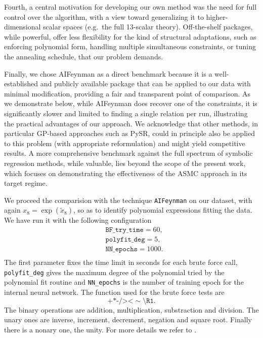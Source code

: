 \documentclass[11pt,a4paper]{article}
\begin{document}
Fourth, a central motivation for developing our own method was the need for full control over the algorithm, with a view toward generalizing it to higher-dimensional scalar spaces (e.g.\ the full 13-scalar theory). Off-the-shelf packages, while powerful, offer less flexibility for the kind of structural adaptations, such as enforcing polynomial form, handling multiple simultaneous constraints, or tuning the annealing schedule, that our problem demands.

Finally, we chose AIFeynman as a direct benchmark because it is a well-established and publicly available package that can be applied to our data with minimal modification, providing a fair and transparent point of comparison. As we demonstrate below, while AIFeynman does recover one of the constraints, it is significantly slower and limited to finding a single relation per run, illustrating the practical advantages of our approach. We acknowledge that other methods, in particular GP-based approaches such as PySR, could in principle also be applied to this problem (with appropriate reformulation) and might yield competitive results. A more comprehensive benchmark against the full spectrum of symbolic regression methods, while valuable, lies beyond the scope of the present work, which focuses on demonstrating the effectiveness of the ASMC approach in its target regime.

We proceed the comparision with the technique \texttt{AIFeynman} \cite{Udrescu:2019mnk} on our dataset, with again $x_8 = \exp(\tilde{x}_8)$, so as to identify polynomial expressions fitting the data. We have run it with the following configuration 
\begin{equation}
	\begin{aligned}
		&\texttt{BF\_try\_time} = 60, \\
		&\texttt{polyfit\_deg} = 5, \\
		&\texttt{NN\_epochs} = 1000.\\
	\end{aligned}
\end{equation}
The first parameter fixes the time limit in seconds for each brute force call, \texttt{polyfit\_deg} gives the maximum degree of the polynomial tried by the polynomial fit routine and \texttt{NN\_epochs} is the number of training epoch for the internal neural network. The function used for the brute force tests are 
\begin{equation}
\texttt{+*-/><} \sim \texttt{\textbackslash R1}.
\end{equation}
The binary operations are addition, multiplication, substraction and division. The unary ones are inverse, increment, decrement, negation and square root. Finally there is a nonary one, the unity. For more details we refer to \cite{Udrescu:2019mnk}.
\end{document}
